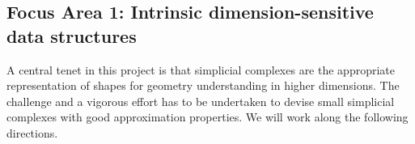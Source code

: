 \subsection*{Focus Area 1:  Intrinsic dimension-sensitive data structures} 

A central tenet in this project is that simplicial complexes are the appropriate representation of shapes  for geometry understanding in higher dimensions. 
The challenge and a vigorous effort has to be undertaken to devise small simplicial complexes with good approximation properties.
We will work along the following directions.






